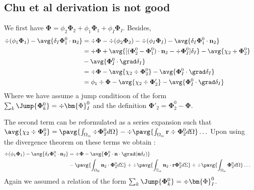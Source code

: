 \subsection{Chu et al derivation is not good}
We first have $\bm{\Phi} = \phi_2 \bm{\Phi}_2+\phi_1 \bm{\Phi}_1 + \phi_I \bm{\Phi}_I$. 
Besides,
\begin{align*}
    \div  (\phi_1 \mathbf{\Phi}_1)
    - \avg{\delta_I \mathbf{\Phi}_1^0 \cdot \textbf{n}_2}
    &=
    \div  \mathbf{\Phi}
    - \div  (\phi_2\mathbf{\Phi}_2)
    - \div  (\phi_I\mathbf{\Phi}_I)
    - \avg{\delta_I \mathbf{\Phi}_1^0 \cdot \textbf{n}_2}\\
    &=
    \div  \mathbf{\Phi}
    + \avg{ [(\mathbf{\Phi}_2^0 - \mathbf{\Phi}_1^0) \cdot \textbf{n}_2 - \div \mathbf{\Phi}_I^0]\delta_I}
    - \avg{ \chi_2 \div \mathbf{\Phi}_2^0  }\\
    &- \avg{ \mathbf{\Phi}_I^0  \cdot \grad\delta_I}
    \\
    &=
    \div  \mathbf{\Phi}
    - \avg{ \chi_2 \div \mathbf{\Phi}_2^0  }
    - \avg{ \mathbf{\Phi}_I^0  \cdot \grad\delta_I}
    \\
    &=
    \phi_1 \div  \mathbf{\Phi}
    - \avg{ \chi_2 \div \mathbf{\Phi}_2'  }
    - \avg{ \mathbf{\Phi}_I^0  \cdot \grad\delta_I}
    \\
\end{align*}
Where we have assume a jump conditioon of the form $\sum_k \Jump{\mathbf{\Phi}_k^0} = \div \bm{\Phi}_I^0$ and the definition $\bm{\Phi}'_2 = \bm{\Phi}_2^0 - \bm{\Phi}$.


The second term can be reformulated as a series expansion such that 
$\avg{ \chi_2 \div \mathbf{\Phi}_2^0  } = \pavg{\int_{\Omega_\alpha} \div \mathbf{\Phi}_2^0 d\Omega} - \div\pavg{\int_{\Omega_\alpha} \textbf{r} \div \mathbf{\Phi}_2^0 d\Omega} \ldots $
Upon using the divergence theorem on these terms we obtain :
\begin{align*}
    \div  (\phi_1 \mathbf{\Phi}_1)
    - \avg{\delta_I \mathbf{\Phi}_1^0 \cdot \textbf{n}_2}
    &=
    \div  \mathbf{\Phi}
    - \avg{ \mathbf{\Phi}_I^0  \cdot \textbf{n}\cdot\grad(\textbf{n} \delta_I)}\\
    &- \pavg{\int_{\Omega_\Sigma} \textbf{n}_2 \cdot \mathbf{\Phi}_2^0 d\Sigma} 
    + \div\pavg{\int_{\Sigma_\alpha}  \textbf{n}_2 \cdot \textbf{r}\mathbf{\Phi}_2^0 d\Sigma} 
    + \div\pavg{\int_{\Omega_\alpha}  \mathbf{\Phi}_2^0 d\Omega} \ldots
    \\
\end{align*}
Again we assumed a relation of the form $\sum_k \Jump{\mathbf{\Phi}_k^0} = \div \bm{\Phi}_I^0$. 

